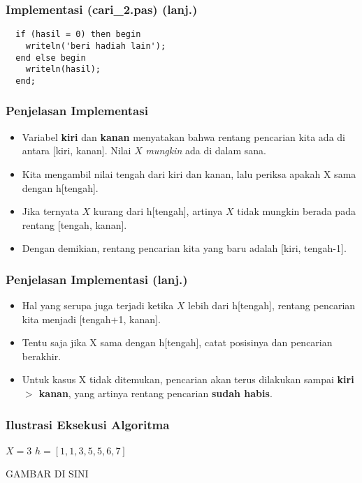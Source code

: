 \documentclass{beamer}
\begin{document}
\begin{frame}[fragile]
\frametitle{Implementasi (cari\_2.pas) (lanj.)}
\begin{lstlisting}
  if (hasil = 0) then begin
    writeln('beri hadiah lain');
  end else begin
    writeln(hasil);
  end;
\end{lstlisting}
\end{frame}

\begin{frame}
\frametitle{Penjelasan Implementasi}
\begin{itemize}
  \item Variabel \textbf{kiri} dan \textbf{kanan} menyatakan bahwa rentang pencarian kita ada di antara [kiri, kanan]. Nilai $X$ \textit{mungkin} ada di dalam sana.
  \item Kita mengambil nilai tengah dari kiri dan kanan, lalu periksa apakah X sama dengan h[tengah].
  \item Jika ternyata $X$ kurang dari h[tengah], artinya $X$ tidak mungkin berada pada rentang [tengah, kanan].
  \item Dengan demikian, rentang pencarian kita yang baru adalah [kiri, tengah-1].
\end{itemize}
\end{frame}

\begin{frame}
\frametitle{Penjelasan Implementasi (lanj.)}
\begin{itemize}
  \item Hal yang serupa juga terjadi ketika $X$ lebih dari h[tengah], rentang pencarian kita menjadi [tengah+1, kanan].
  \item Tentu saja jika X sama dengan h[tengah], catat posisinya dan pencarian berakhir.
  \item Untuk kasus X tidak ditemukan, pencarian akan terus dilakukan sampai \textbf{kiri $>$ kanan}, yang artinya rentang pencarian \textbf{sudah habis}.
\end{itemize}
\end{frame}

\begin{frame}
\frametitle{Ilustrasi Eksekusi Algoritma}
$X=3$ \hfil $h=[1, 1, 3, 5, 5, 6, 7]$

GAMBAR DI SINI
\end{frame}
\end{document}
